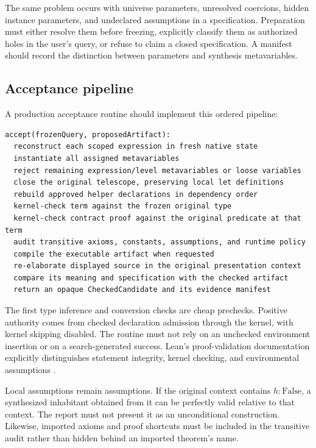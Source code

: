 \documentclass[11pt,a4paper]{article}
\newcommand{\code}[1]{\texttt{\detokenize{#1}}}
\theoremstyle{remark}
\begin{document}
The same problem occurs with universe parameters, unresolved coercions, hidden instance parameters, and undeclared assumptions in a specification. Preparation must either resolve them before freezing, explicitly classify them as authorized holes in the user's query, or refuse to claim a closed specification. A manifest should record the distinction between parameters and synthesis metavariables.

\subsection{Acceptance pipeline}

A production acceptance routine should implement this ordered pipeline:
\begin{lstlisting}
accept(frozenQuery, proposedArtifact):
  reconstruct each scoped expression in fresh native state
  instantiate all assigned metavariables
  reject remaining expression/level metavariables or loose variables
  close the original telescope, preserving local let definitions
  rebuild approved helper declarations in dependency order
  kernel-check term against the frozen original type
  kernel-check contract proof against the original predicate at that term
  audit transitive axioms, constants, assumptions, and runtime policy
  compile the executable artifact when requested
  re-elaborate displayed source in the original presentation context
  compare its meaning and specification with the checked artifact
  return an opaque CheckedCandidate and its evidence manifest
\end{lstlisting}

The first type inference and conversion checks are cheap prechecks. Positive authority comes from checked declaration admission through the kernel, with kernel skipping disabled. The routine must not rely on an unchecked environment insertion or on a search-generated \code{inferType} success. Lean's proof-validation documentation explicitly distinguishes statement integrity, kernel checking, and environmental assumptions \cite{lean-validation}.

Local assumptions remain assumptions. If the original context contains $h:\mathrm{False}$, a synthesized inhabitant obtained from it can be perfectly valid relative to that context. The report must not present it as an unconditional construction. Likewise, imported axioms and proof shortcuts must be included in the transitive audit rather than hidden behind an imported theorem's name.
\end{document}
